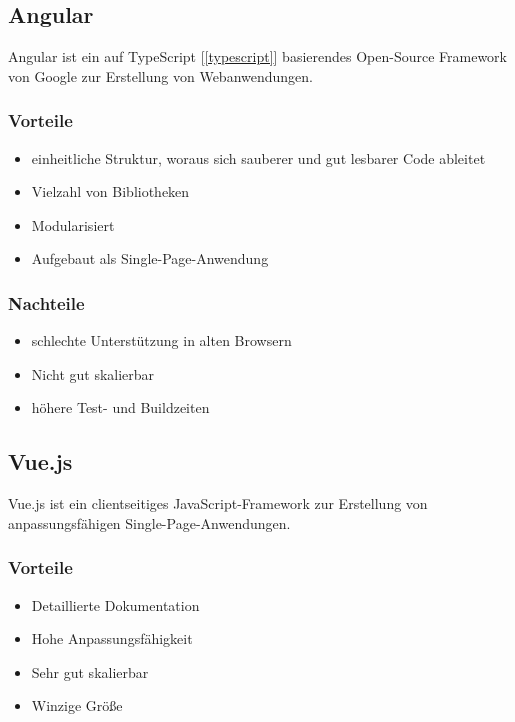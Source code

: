 \subsection{Angular}
Angular ist ein auf TypeScript [\ref{typescript}] basierendes Open-Source Framework von Google zur Erstellung von Webanwendungen. 
\cite{angular1} \cite{angular2}

\subsubsection{Vorteile}
\begin{itemize}
    \item einheitliche Struktur, woraus sich sauberer und gut lesbarer Code ableitet
    \item Vielzahl von Bibliotheken
    \item Modularisiert
    \item Aufgebaut als Single-Page-Anwendung
\end{itemize}

\subsubsection{Nachteile}
\begin{itemize}
    \item schlechte Unterstützung in alten Browsern
    \item Nicht gut skalierbar
    \item höhere Test- und Buildzeiten
\end{itemize}

\subsection{Vue.js}
Vue.js ist ein clientseitiges JavaScript-Framework zur Erstellung von anpassungsfähigen Single-Page-Anwendungen.

\subsubsection{Vorteile}
\begin{itemize}
    \item Detaillierte Dokumentation
    \item Hohe Anpassungsfähigkeit
    \item Sehr gut skalierbar
    \item Winzige Größe
\end{itemize}


